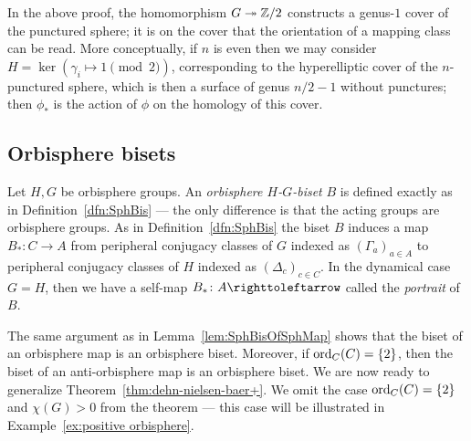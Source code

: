 \documentclass{amsart}
\begin{document}
\begin{rem}
  In the above proof, the homomorphism $G\twoheadrightarrow{\mathbb Z}/2$
  constructs a genus-$1$ cover of the punctured sphere; it is on the
  cover that the orientation of a mapping class can be read. More
  conceptually, if $n$ is even then we may consider
  $H=\ker(\gamma_i\mapsto1\pmod2)$, corresponding to the hyperelliptic
  cover of the $n$-punctured sphere, which is then a surface of genus
  $n/2-1$ without punctures; then $\phi_*$ is the action of $\phi$ on
  the homology of this cover.
\end{rem}

\subsection{Orbisphere bisets}
Let $H,G$ be orbisphere groups. An \emph{orbisphere $H$-$G$-biset} $B$
is defined exactly as in Definition~\ref{dfn:SphBis} --- the only
difference is that the acting groups are orbisphere groups. As in
Definition~\ref{dfn:SphBis} the biset $B$ induces a map
$B_*\colon C\to A$ from peripheral conjugacy classes of $G$ indexed as
$(\Gamma_a)_{a\in A}$ to peripheral conjugacy classes of $H$ indexed
as $(\Delta_c)_{c\in C}$. In the dynamical case $G=H$, then we have a
self-map $B_*\colon A\selfmap$ called the \emph{portrait} of $B$.

The same argument as in Lemma~\ref{lem:SphBisOfSphMap} shows that the
biset of an orbisphere map is an orbisphere biset. Moreover, if
$\operatorname{ord}_C(C)= \{2\}$, then the biset of an anti-orbisphere map is an
orbisphere biset. We are now ready to generalize
Theorem~\ref{thm:dehn-nielsen-baer+}. We omit the case
$\operatorname{ord}_C(C)= \{2\}$ and $\chi(G)> 0$ from the theorem --- this case
will be illustrated in Example~\ref{ex:positive orbisphere}.
\end{document}
